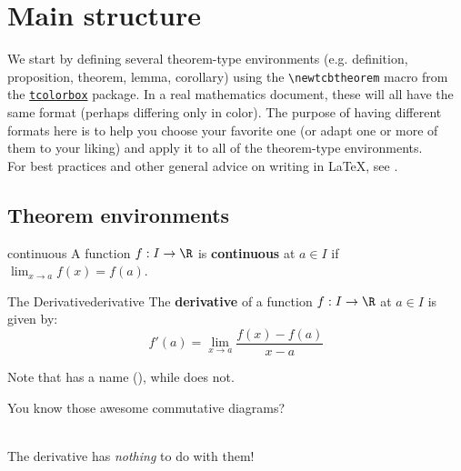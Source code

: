 \documentclass[10pt]{extarticle}
\newcommand{\limx}[1][a]{\lim_{x\to#1}}
\newcommand{\<}{\langle}
\renewcommand{\>}{\rangle}
\theoremstyle{mystyle}{\newtheorem*{remark}{Remark}}
\theoremstyle{mystyle}{\newtheorem*{remarks}{Remarks}}
\theoremstyle{mystyle}{\newtheorem*{example}{Example}}
\theoremstyle{mystyle}{\newtheorem*{examples}{Examples}}
\theoremstyle{definition}{\newtheorem*{exercise}{Exercise}}
\theoremstyle{warn}
\begin{document}
\newpage

\section{Main structure}

We start by defining several theorem-type environments (e.g. definition, proposition, theorem, lemma, corollary) using the \verb!\newtcbtheorem! macro from the \href{https://ctan.org/pkg/tcolorbox}{\texttt{tcolorbox}} package. In a real mathematics document, these will all have the same format (perhaps differing only in color). The purpose of having different formats here is to help you choose your favorite one (or adapt one or more of them to your liking) and apply it to all of the theorem-type environments.\\

For best practices and other general advice on writing in \LaTeX, see \cite{evanchen,gleave}.

\subsection{Theorem environments}

\begin{definition}{}{continuous}
A function $f:I\to\R$ is \textbf{continuous} at $a\in I$ if $\limx f(x)=f(a)$.
\end{definition}

\begin{definition}{The Derivative}{derivative}
The \textbf{derivative} of a function $f:I\to\R$ at $a\in I$ is given by:
\begin{equation*}
    f'(a)=\limx\frac{f(x)-f(a)}{x-a}
\end{equation*}
\end{definition}

Note that  has a name (), while  does not.

\begin{center}
You know those awesome commutative diagrams?\\
\\
The derivative has \emph{nothing} to do with them!
\end{center}
\end{document}
